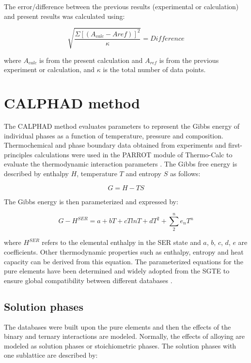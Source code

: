The error/difference between the previous results (experimental or calculation) and present results was calculated using:

\begin{equation}
\label{eq: error}
\sqrt{\frac{\Sigma[(A_{calc}-A{ref})]^{2}}{\kappa}} = Difference
\end{equation}

\noindent where $A_{calc}$ is from the present calculation and $A_{ref}$ is from the previous experiment or calculation, and $\kappa$ is the total number of data points. 

\section{CALPHAD method}

The CALPHAD method evaluates parameters to represent the Gibbs energy of individual phases as a function of temperature, pressure and composition. Thermochemical and phase boundary data obtained from experiments and first-principles calculations were used in the PARROT module of Thermo-Calc to evaluate the thermodynamic interaction parameters \cite{Andersson2002}. The Gibbs free energy is described by enthalpy $H$, temperature $T$ and entropy $S$ as follows:

\begin{equation}
\label{eq: gibbs}
G = H - T S 
\end{equation}

\noindent The Gibbs energy is then parameterized and expressed by:

\begin{equation}
\label{eq: parameterizaiton}
G - H^{SER} = a + bT + cT ln T + d T^2 + \sum_{2}^{n} e_{n} T^{n}
\end{equation}

\noindent where $H^{SER}$ refers to the elemental enthalpy in the SER state and $a$, $b$, $c$, $d$, $e$ are coefficients. Other thermodynamic properties such as enthalpy, entropy and heat capacity can be derived from this equation. The parameterized equations for the pure elements have been determined and widely adopted from the SGTE to ensure global compatibility between different databases \cite{Dinsdale1991}.

\subsection{Solution phases}

The databases were built upon the pure elements and then the effects of the binary and ternary interactions are modeled. Normally, the effects of alloying are modeled as solution phases or stoichiometric phases. The solution phases with one sublattice are described by: 

